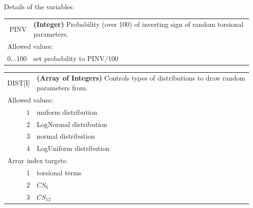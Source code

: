 \documentclass[10pt,a4paper,openany]{memoir}
\numberwithin{equation}{section}
\begin{document}
\noindent Details of the variables:
\vspace{2ex}

{
\begin{tabular}{r@{ : }l}
\label{descr:pinv}
      PINV&\textbf{(Integer)} Probability (over 100) of inverting sign of random torsional parameters.                             \\ 
\multicolumn{2}{l}{Allowed values:} \\ 
    \(0 \ldots 100 \)&set probability to PINV/100                                                                          \\ 
\end{tabular}
\vspace{1ex}
}

{
\begin{tabular}{r@{ : }l}
\label{descr:dist}
      DIST[I]&\textbf{(Array of Integers)} Controls types of distributions to draw random parameters from.                                      \\ 
\multicolumn{2}{l}{Allowed values:} \\ 
     \(1\)&uniform distribution                                                                                 \\ 
\(2\)&LogNormal distribution                                                                                  \\ 
\(3\)&normal distribution                                                                              \\ 
\(4\)&LogUniform distribution                                                                              \\ 
\multicolumn{2}{l}{Array index targets:} \\ 
     \(1\)&torsional terms                                                                                      \\ 
     \(2\)&$CS_6$                                                                                               \\ 
     \(3\)&$CS_{12}$                                                                                            \\ 
\end{tabular}
\vspace{1ex}
}
\end{document}
